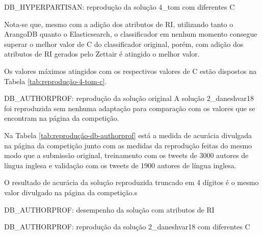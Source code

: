 \documentclass[%
  10pt,%
  aspectratio = 169,%
  compress,%
  t,%
]{beamer}%
\begin{document}
    \begin{frame}{}{DB\_HYPERPARTISAN: reprodução da solução 4\_tom com diferentes C}
        
        Nota-se que, mesmo com a adição dos atributos de RI, utilizando tanto o ArangoDB quanto o Elasticsearch, o classificador em nenhum momento consegue superar o melhor valor de C do classificador original, porém, com adição dos atributos de RI gerados pelo Zettair é atingido o melhor valor.

        Os valores máximos atingidos com os respectivos valores de C estão dispostos na Tabela \ref{tab:reprodução-4-tom-c}.
        
        
    \end{frame}

    \begin{frame}{}{DB\_AUTHORPROF: reprodução da solução original}
        A solução 2\_daneshvar18 foi reproduzida sem nenhuma adaptação para comparação com os valores que se encontram na página da competição.
        
        Na Tabela \ref{tab:reprodução-db-authorprof} está a medida de acurácia divulgada na página da competição \cite{PAN_APCLEF_2018} junto com as medidas da reprodução feitas do mesmo modo que a submissão original, treinamento com os tweets de 3000 autores de língua inglesa e validação com os tweets de 1900 autores de língua inglesa.
        
        

        O resultado de acurácia da solução reproduzida truncado em 4 dígitos é o mesmo valor divulgado na página da competição.s
    \end{frame}

    \begin{frame}{}{DB\_AUTHORPROF: desempenho da solução com atributos de RI}
        \vspace{-0.5cm}
        
    \end{frame}

    \begin{frame}{}{DB\_AUTHORPROF: reprodução da solução 2\_daneshvar18 com diferentes C}
        \begin{columns}[T]
                \vspace{-0.5cm}
                
                \vspace{-0.5cm}
                
        \end{columns}
    \end{frame}
\end{document}

